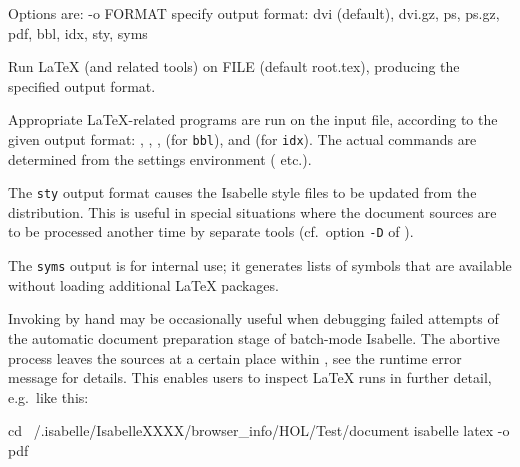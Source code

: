 \begin{isabellebody}
\begin{isamarkuptext}
\begin{ttbox}
  Options are:
    -o FORMAT    specify output format: dvi (default), dvi.gz, ps,
                 ps.gz, pdf, bbl, idx, sty, syms

  Run LaTeX (and related tools) on FILE (default root.tex),
  producing the specified output format.
\end{ttbox}

  Appropriate {\LaTeX}-related programs are run on the input file,
  according to the given output format: \hyperlink{executable.latex}{\mbox{}},
  \hyperlink{executable.pdflatex}{\mbox{}}, \hyperlink{executable.dvips}{\mbox{}}, \hyperlink{executable.bibtex}{\mbox{}}
  (for \verb|bbl|), and \hyperlink{executable.makeindex}{\mbox{}} (for \verb|idx|).  The actual commands are determined from the settings
  environment (\hyperlink{setting.ISABELLE-LATEX}{\mbox{}} etc.).

  The \verb|sty| output format causes the Isabelle style files to
  be updated from the distribution.  This is useful in special
  situations where the document sources are to be processed another
  time by separate tools (cf.\ option \verb|-D| of \hyperlink{tool.usedir}{\mbox{}}).

  The \verb|syms| output is for internal use; it generates lists
  of symbols that are available without loading additional {\LaTeX}
  packages.%
\end{isamarkuptext}%
\isamarkuptrue%
%
\isamarkuptrue%
%
\begin{isamarkuptext}%
Invoking \hyperlink{tool.latex}{\mbox{}} by hand may be occasionally useful when
  debugging failed attempts of the automatic document preparation
  stage of batch-mode Isabelle.  The abortive process leaves the
  sources at a certain place within \hyperlink{setting.ISABELLE-BROWSER-INFO}{\mbox{}},
  see the runtime error message for details.  This enables users to
  inspect {\LaTeX} runs in further detail, e.g.\ like this:

\begin{ttbox}
  cd ~/.isabelle/IsabelleXXXX/browser_info/HOL/Test/document
  isabelle latex -o pdf
\end{ttbox}%
\end{isamarkuptext}%
\isamarkuptrue%
%
\isadelimtheory
%
\endisadelimtheory
%
\isatagtheory
{}\isamarkupfalse%
%
\endisatagtheory
{\isafoldtheory}%
%
\isadelimtheory
%
\endisadelimtheory
\end{isabellebody}%
